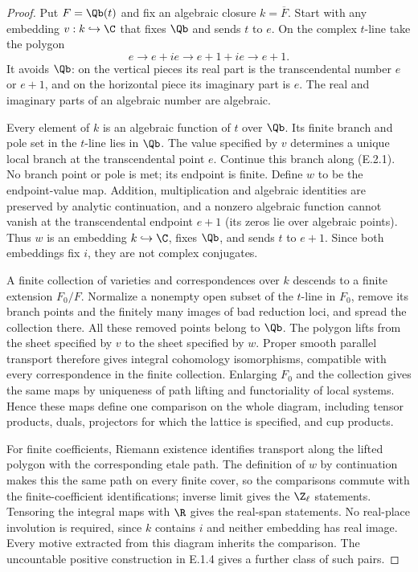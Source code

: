 \begin{proof}
Put $F=\Qb(t)$ and fix an algebraic closure $k=\overline F$. Start with any embedding $v:k\hookrightarrow\C$ that fixes $\Qb$ and sends $t$ to $e$. On the complex $t$-line take the polygon
\[
 e\longrightarrow e+ie\longrightarrow e+1+ie\longrightarrow e+1.
 \tag{E.2.1}
\]
It avoids $\Qb$: on the vertical pieces its real part is the transcendental number $e$ or $e+1$, and on the horizontal piece its imaginary part is $e$. The real and imaginary parts of an algebraic number are algebraic.

Every element of $k$ is an algebraic function of $t$ over $\Qb$. Its finite branch and pole set in the $t$-line lies in $\Qb$. The value specified by $v$ determines a unique local branch at the transcendental point $e$. Continue this branch along (E.2.1). No branch point or pole is met; its endpoint is finite. Define $w$ to be the endpoint-value map. Addition, multiplication and algebraic identities are preserved by analytic continuation, and a nonzero algebraic function cannot vanish at the transcendental endpoint $e+1$ (its zeros lie over algebraic points). Thus $w$ is an embedding $k\hookrightarrow\C$, fixes $\Qb$, and sends $t$ to $e+1$. Since both embeddings fix $i$, they are not complex conjugates.

A finite collection of varieties and correspondences over $k$ descends to a finite extension $F_0/F$. Normalize a nonempty open subset of the $t$-line in $F_0$, remove its branch points and the finitely many images of bad reduction loci, and spread the collection there. All these removed points belong to $\Qb$. The polygon lifts from the sheet specified by $v$ to the sheet specified by $w$. Proper smooth parallel transport therefore gives integral cohomology isomorphisms, compatible with every correspondence in the finite collection. Enlarging $F_0$ and the collection gives the same maps by uniqueness of path lifting and functoriality of local systems. Hence these maps define one comparison on the whole diagram, including tensor products, duals, projectors for which the lattice is specified, and cup products.

For finite coefficients, Riemann existence identifies transport along the lifted polygon with the corresponding etale path. The definition of $w$ by continuation makes this the same path on every finite cover, so the comparisons commute with the finite-coefficient identifications; inverse limit gives the $\Z_\ell$ statements. Tensoring the integral maps with $\R$ gives the real-span statements. No real-place involution is required, since $k$ contains $i$ and neither embedding has real image. Every motive extracted from this diagram inherits the comparison. The uncountable positive construction in E.1.4 gives a further class of such pairs.
\end{proof}

